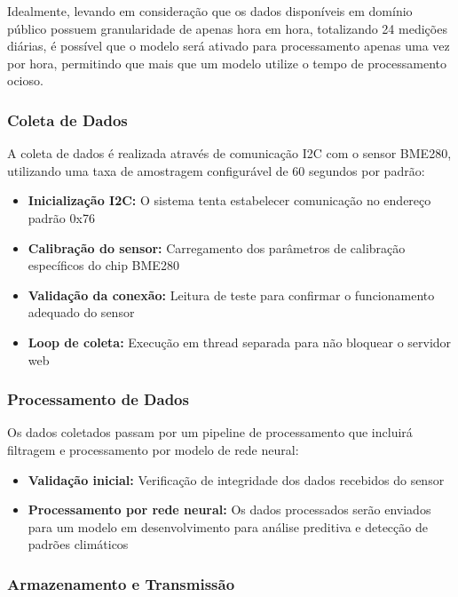 Idealmente, levando em consideração que os dados disponíveis em domínio público possuem granularidade de apenas hora em hora, totalizando 24 medições diárias, é possível que o modelo será ativado para processamento apenas uma vez por hora, permitindo que mais que um modelo utilize o tempo de processamento ocioso.

\subsubsection{Coleta de Dados}

A coleta de dados é realizada através de comunicação I2C com o sensor BME280, utilizando uma taxa de amostragem configurável de 60 segundos por padrão:

\begin{itemize}
    \item \textbf{Inicialização I2C:} O sistema tenta estabelecer comunicação no endereço padrão 0x76
    \item \textbf{Calibração do sensor:} Carregamento dos parâmetros de calibração específicos do chip BME280
    \item \textbf{Validação da conexão:} Leitura de teste para confirmar o funcionamento adequado do sensor
    \item \textbf{Loop de coleta:} Execução em thread separada para não bloquear o servidor web
\end{itemize}

\subsubsection{Processamento de Dados}

Os dados coletados passam por um pipeline de processamento que incluirá filtragem e processamento por modelo de rede neural:

\begin{itemize}
    \item \textbf{Validação inicial:} Verificação de integridade dos dados recebidos do sensor
    \item \textbf{Processamento por rede neural:} Os dados processados serão enviados para um modelo em desenvolvimento para análise preditiva e detecção de padrões climáticos
\end{itemize}

\subsubsection{Armazenamento e Transmissão}


